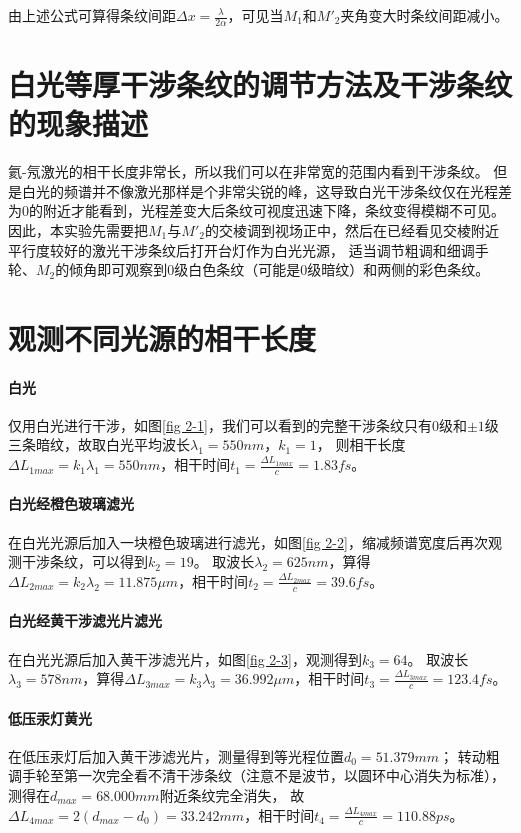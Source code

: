 \documentclass[12pt, a4paper]{ctexart}
\begin{document}
由上述公式可算得条纹间距$\Delta x = \frac{\lambda}{2\alpha}$，可见当$M_1$和$M'_2$夹角变大时条纹间距减小。

\section{白光等厚干涉条纹的调节方法及干涉条纹的现象描述}

氦-氖激光的相干长度非常长，所以我们可以在非常宽的范围内看到干涉条纹。
但是白光的频谱并不像激光那样是个非常尖锐的峰，这导致白光干涉条纹仅在光程差为0的附近才能看到，光程差变大后条纹可视度迅速下降，条纹变得模糊不可见。
因此，本实验先需要把$M_1$与$M'_2$的交棱调到视场正中，然后在已经看见交棱附近平行度较好的激光干涉条纹后打开台灯作为白光光源，
适当调节粗调和细调手轮、$M_2$的倾角即可观察到0级白色条纹（可能是0级暗纹）和两侧的彩色条纹。

\section{观测不同光源的相干长度}

\paragraph{白光} 仅用白光进行干涉，如图\ref{fig 2-1}，我们可以看到的完整干涉条纹只有0级和$\pm 1$级三条暗纹，故取白光平均波长$\lambda_1 = 550 nm$，$k_1 = 1$，
则相干长度$\Delta L_{1max} = k_1 \lambda_1 = 550nm $，相干时间$t_1 = \frac{\Delta L_{1max}}{c} = 1.83 fs$。

\paragraph{白光经橙色玻璃滤光} 在白光光源后加入一块橙色玻璃进行滤光，如图\ref{fig 2-2}，缩减频谱宽度后再次观测干涉条纹，可以得到$k_2 = 19$。
取波长$\lambda_2 = 625 nm$，算得$\Delta L_{2max} = k_2 \lambda_2 = 11.875 \mu m$，相干时间$t_2 = \frac{\Delta L_{2max}}{c} = 39.6 fs$。

\paragraph{白光经黄干涉滤光片滤光} 在白光光源后加入黄干涉滤光片，如图\ref{fig 2-3}，观测得到$k_3 = 64$。
取波长$\lambda_3 = 578 nm $，算得$\Delta L_{3max} = k_3 \lambda_3 = 36.992 \mu m$，相干时间$t_3 = \frac{\Delta L_{3max}}{c} = 123.4 fs$。

\paragraph{低压汞灯黄光} 在低压汞灯后加入黄干涉滤光片，测量得到等光程位置$d_0 = 51.379mm$；
转动粗调手轮至第一次完全看不清干涉条纹（注意不是波节，以圆环中心消失为标准），测得在$d_{max} = 68.000mm$附近条纹完全消失，
故$\Delta L_{4max} = 2(d_{max} - d_0) = 33.242mm$，相干时间$t_4 = \frac{\Delta L_{4max}}{c} = 110.88 ps$。
\end{document}
